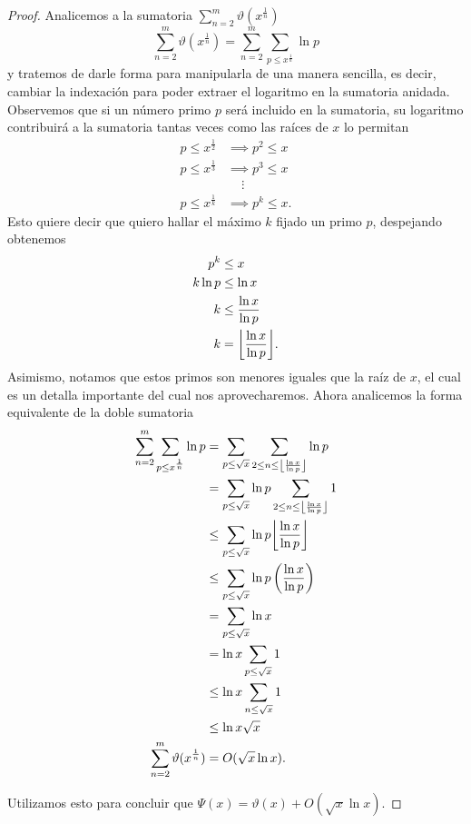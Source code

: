 \documentclass{article}
\DeclarePairedDelimiter\floor{\lfloor}{\rfloor}
\theoremstyle{definition}
\theoremstyle{remark}
\begin{document}
\begin{proof}
Analicemos a la sumatoria $\sum_{n = 2}^m \vartheta(x^\frac{1}{n})$
$$\sum_{n = 2}^m \vartheta(x^\frac{1}{n}) = \sum_{n = 2}^m \sum_{p \leq x^\frac{1}{n}} \ln p$$
y tratemos de darle forma para manipularla de una manera sencilla, es decir,
cambiar la indexaci\'on para poder extraer el logaritmo en la sumatoria anidada.
Observemos que si un n\'umero primo $p$ ser\'a incluido en la sumatoria, su logaritmo contribuir\'a a la sumatoria
tantas veces como las ra\'ices de $x$ lo permitan
\begin{align*}
p \leq x^\frac{1}{2} &\implies p^2 \leq x \\
p \leq x^\frac{1}{3} &\implies p^3 \leq x \\
&\,\,\,\,\,\,\,\vdots \\
p \leq x^\frac{1}{k} &\implies p^k \leq x.
\end{align*}
Esto quiere decir que quiero hallar el m\'aximo $k$ fijado un primo $p$, despejando obtenemos
\begin{align*}
p^k &\leq x \\
k \ln p &\leq \ln x \\
k &\leq \frac{\ln x}{\ln p} \\
k &= \floor*{\frac{\ln x}{\ln p}}.
\end{align*}
Asimismo, notamos que estos primos son menores iguales que la ra\'iz de $x$, el cual es un detalla importante del cual nos aprovecharemos.
Ahora analicemos la forma equivalente de la doble sumatoria
\begin{align*}
\sum_{n = 2}^m \sum_{p \leq x^\frac{1}{n}} \ln p &= \sum_{p \leq \sqrt{x}} \sum_{2 \leq n \leq \floor*{\frac{\ln x}{\ln p}}} \ln p \\
&= \sum_{p \leq \sqrt{x}} \ln p \sum_{2 \leq n \leq \floor*{\frac{\ln x}{\ln p}}} 1 \\
&\leq \sum_{p \leq \sqrt{x}} \ln p \floor*{\frac{\ln x}{\ln p}} \\
&\leq \sum_{p \leq \sqrt{x}} \ln p \left(\frac{\ln x}{\ln p}\right) \\
&= \sum_{p \leq \sqrt{x}} \ln x \\
&= \ln x \sum_{p \leq \sqrt{x}} 1 \\
&\leq \ln x \sum_{n \leq \sqrt{x}} 1 \\
&\leq \ln x \sqrt{x} \\
\sum_{n = 2}^m \vartheta(x^\frac{1}{n}) &= O(\sqrt{x} \ln x).
\end{align*}

Utilizamos esto para concluir que $\Psi(x) = \vartheta(x) + O(\sqrt{x} \ln x)$.
\end{proof}
\end{document}
